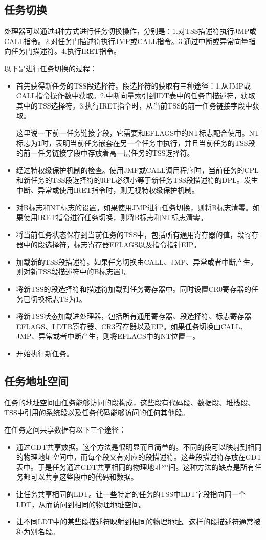 \documentclass[a4paper,left=2.5cm,right=2.5cm,11pt]{article}
\begin{document}
\subsection{任务切换}
	处理器可以通过4种方式进行任务切换操作，分别是：1.对TSS描述符执行JMP或CALL指令。2.对任务门描述符执行JMP或CALL指令。3.通过中断或异常向量指向任务门描述符。4.执行IRET指令。\par
	以下是进行任务切换的过程：
	\begin{itemize}
		\item 首先获得新任务的TSS段选择符。段选择符的获取有三种途径：1.从JMP或CALL指令操作数中获取。2.中断向量索引到IDT表中的任务门描述符，获取其中的TSS选择符。3.执行IRET指令时，从当前TSS的前一任务链接字段中获取。\par
		这里说一下前一任务链接字段，它需要和EFLAGS中的NT标志配合使用。NT标志为1时，表明当前任务嵌套在另一个任务中执行，并且当前任务的TSS段的前一任务链接字段中存放着高一层任务的TSS选择符。
		\item 经过特权级保护机制的检查。使用JMP或CALL调用程序时，当前任务的CPL和新任务的TSS段选择符的RPL必须小等于新任务TSS段描述符的DPL。发生中断、异常或使用IRET指令时，则无视特权级保护机制。
		\item 对B标志和NT标志的设置。如果使用JMP进行任务切换，则将B标志清零。如果使用IRET指令进行任务切换，则将B标志和NT标志清零。
		\item 将当前任务状态保存到当前任务的TSS中，包括所有通用寄存器的值，段寄存器中的段选择符，标志寄存器EFLAGS以及指令指针EIP。
		\item 加载新的TSS段描述符。如果任务切换由CALL、JMP、异常或者中断产生，则对新TSS段描述符中的B标志置1。
		\item 将新TSS的段选择符和描述符加载到任务寄存器中。同时设置CR0寄存器的任务已切换标志TS为1。
		\item 将新TSS状态加载进处理器，包括所有通用寄存器、段选择符、标志寄存器EFLAGS、LDTR寄存器、CR3寄存器以及EIP。如果任务切换由CALL、JMP、异常或者中断产生，则将EFLAGS中的NT位置一。
		\item 开始执行新任务。
	\end{itemize}
\subsection{任务地址空间}
	任务的地址空间由任务能够访问的段构成，这些段有代码段、数据段、堆栈段、TSS中引用的系统段以及任务代码能够访问的任何其他段。\par
	在任务之间共享数据有以下三个途径：
	\begin{itemize}
		\item 通过GDT共享数据。这个方法是很明显而且简单的。不同的段可以映射到相同的物理地址空间中，而每个段又有对应的段描述符。这些段描述符存放在GDT表中。于是任务通过GDT共享相同的物理地址空间。这种方法的缺点是所有任务都可以共享这些段中的代码和数据。
		\item 让任务共享相同的LDT。让一些特定的任务的TSS中LDT字段指向同一个LDT，从而访问到相同的物理地址空间。
		\item 让不同LDT中的某些段描述符映射到相同的物理地址。这样的段描述符通常被称为别名段。
	\end{itemize}
\end{document}
